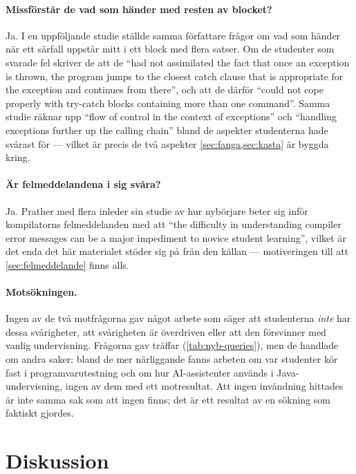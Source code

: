 \paragraph{Missförstår de vad som händer med resten av blocket?}
Ja.  I en uppföljande studie ställde samma författare frågor om vad som
händer när ett särfall uppstår mitt i ett block med flera satser.  Om de
studenter som svarade fel skriver de att de \enquote{had not assimilated
the fact that once an exception is thrown, the program jumps to the
closest catch clause that is appropriate for the exception and continues
from there}, och att de därför \enquote{could not cope properly with
try-catch blocks containing more than one
command}\autocite[343]{RashkovitsLavy2012}.  Samma studie räknar upp
\enquote{flow of control in the context of exceptions} och
\enquote{handling exceptions further up the calling chain} bland de
aspekter studenterna hade svårast
för\autocite[350]{RashkovitsLavy2012} --- vilket är precis de två
aspekter \cref{sec:fanga,sec:kasta} är byggda kring.

\paragraph{Är felmeddelandena i sig svåra?}
Ja.  Prather med flera inleder sin studie av hur nybörjare beter sig
inför kompilatorns felmeddelanden med att \enquote{the difficulty in
understanding compiler error messages can be a major impediment to
novice student learning}\autocite{Prather2017CEM}, vilket är det enda
det här materialet stöder sig på från den källan --- motiveringen till
att \cref{sec:felmeddelande} finns alls.

\paragraph{Motsökningen.}
Ingen av de två motfrågorna gav något arbete som säger att studenterna
\emph{inte} har dessa svårigheter, att svårigheten är överdriven eller
att den försvinner med vanlig undervisning.  Frågorna gav träffar
(\cref{tab:nyb-queries}), men de handlade om andra saker: bland de mer
närliggande fanns arbeten om var studenter kör fast i
programvarutestning och om hur AI-assistenter används i
Java-undervisning, ingen av dem med ett motresultat.  Att ingen
invändning hittades är inte samma sak som att ingen finns; det är ett
resultat av en sökning som faktiskt gjordes.

\section{Diskussion}
\label{sec:nyb-diskussion}

